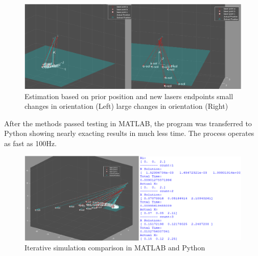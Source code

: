 \documentclass[a4paper]{article}
\begin{document}
\begin{figure}
	\includegraphics[width=\textwidth]{resection_fig7}
	\caption{Estimation based on prior position and new lasers endpoints small changes in orientation (Left) large changes in orientation (Right) }
	\label{fig:long2}
\end{figure} 

After the methods passed testing in MATLAB, the program was transferred to Python showing nearly exacting results in much less time. The process operates as fast as 100Hz.

\begin{figure}
	\includegraphics[width=\textwidth]{resection_fig8.png}
	\caption{Iterative simulation comparison in MATLAB and Python}
\end{figure}
\end{document}
